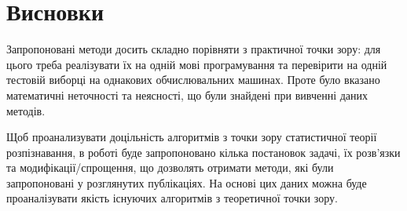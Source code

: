\section{Висновки}

Запропоновані методи досить складно порівняти з практичної точки зору:
для цього треба реалізувати їх на одній мові програмування
та перевірити на одній тестовій виборці на однакових обчислювальних машинах.
Проте було вказано математичні неточності та неясності,
що були знайдені при вивченні даних методів.

Щоб проанализувати доцільність алгоритмів
з точки зору статистичної теорії розпізнавання,
в роботі буде запропоновано кілька постановок задачі,
їх розв'язки та модифікації/спрощення, що дозволять отримати методи,
які були запропоновані у розглянутих публікаціях.
На основі цих даних можна буде проаналізувати якість існуючих алгоритмів
з теоретичної точки зору.
